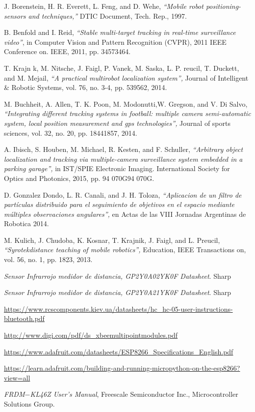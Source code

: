 \documentclass[conference,a4paper,9pt]{IEEEtran}
\begin{document}
\begin{thebibliography}{4}

 J. Borenstein, H. R. Everett, L. Feng, and D. Wehe, \emph{“Mobile robot positioning-sensors and techniques,”} DTIC Document, Tech. Rep., 1997.

 B. Benfold and I. Reid, \emph{“Stable multi-target tracking in real-time surveillance video”}, in Computer Vision and Pattern Recognition (CVPR), 2011 IEEE Conference on. IEEE, 2011, pp. 34573464.

 T. Krajn k, M. Nitsche, J. Faigl, P. Vanek, M. Saska, L. P. reucil, T. Duckett, and M. Mejail, \emph{“A practical multirobot localization system”,} Journal of Intelligent & Robotic Systems, vol. 76, no. 3-4, pp. 539562, 2014.

 M. Buchheit, A. Allen, T. K. Poon, M. Modonutti,W. Gregson, and V. Di Salvo, \emph{“Integrating different tracking systems in football: multiple camera semi-automatic system, local position measurement and gps technologies”,} Journal of sports sciences, vol. 32, no. 20, pp. 18441857, 2014.

 A. Ibisch, S. Houben, M. Michael, R. Kesten, and F. Schuller, \emph{“Arbitrary object localization and tracking via multiple-camera surveillance system embedded in a parking garage”,} in IST/SPIE Electronic Imaging. International Society for Optics and Photonics, 2015, pp. 94 070G94 070G.

 D. Gonzalez Dondo, L. R. Canali, and J. H. Toloza, \emph{“Aplicacion de un filtro de partículas distribuido para el seguimiento de objetivos en el espacio mediante múltiples observaciones angulares”,} en Actas de las VIII Jornadas Argentinas de Robotica 2014.

 M. Kulich, J. Chudoba, K. Kosnar, T. Krajnik, J. Faigl, and L. Preucil, \emph{“Syrotekdistance teaching of mobile robotics”,} Education, IEEE Transactions on, vol. 56, no. 1, pp. 1823, 2013.

 \emph{Sensor Infrarrojo medidor de distancia, GP2Y0A02YK0F Datasheet}. Sharp

 \emph{Sensor Infrarrojo medidor de distancia, GP2Y0A21YK0F Datasheet}. Sharp

 \url{https://www.rcscomponents.kiev.ua/datasheets/hc_hc-05-user-instructions-bluetooth.pdf}

 \url{http://www.digi.com/pdf/ds_xbeemultipointmodules.pdf}

 \url{https://www.adafruit.com/datasheets/ESP8266_Specifications_English.pdf}

 \url{https://learn.adafruit.com/building-and-running-micropython-on-the-esp8266?view=all}

 \emph{FRDM$-$KL46Z User’s Manual}, Freescale Semiconductor Inc., Microcontroller Solutions Group.

\end{thebibliography}
\end{document}
